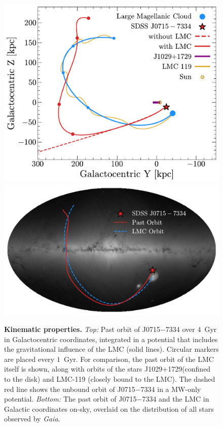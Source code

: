 \documentclass{natureprintstyle}
\newcommand{\umpstar}{J0715$-$7334\xspace}
\newcommand{\caffaustar}{J1029$+$1729\xspace}
\begin{document}
\begin{figure}[h!]
    \centering
    \includegraphics[width=\linewidth]{ump_yz_timeticks.pdf}
    \includegraphics[width=\linewidth]{ump_orbit_map.pdf}
    \caption{\textbf{Kinematic properties.}
    \textit{Top:}
    Past orbit of \umpstar over $4$~Gyr in Galactocentric coordinates, integrated in a potential that includes the gravitational influence of the LMC (solid lines). 
    Circular markers are placed every $1$~Gyr. 
    For comparison, the past orbit of the LMC itself is shown, along with orbits of the stars \caffaustar (confined to the disk) and LMC-119 (closely bound to the LMC).
    The dashed red line shows the unbound orbit of \umpstar in a MW-only potential.
    \textit{Bottom:} The past orbit of \umpstar and the LMC in Galactic coordinates on-sky, overlaid on the distribution of all stars observed by \textit{Gaia}. 
    }
    \label{fig:kinematics}
    \vspace{-2mm}
\end{figure}
\end{document}
